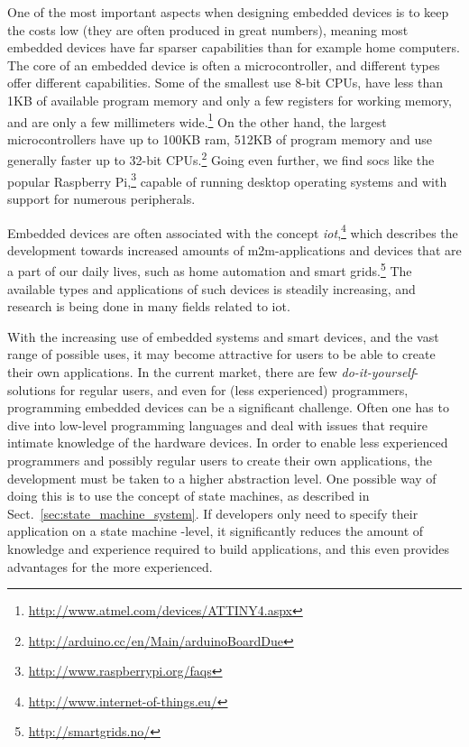 \noindent
One of the most important aspects when designing embedded devices is to keep the costs low (they are often produced in great numbers), meaning most embedded devices have far sparser capabilities than for example home computers. The core of an embedded device is often a microcontroller, and different types offer different capabilities. Some of the smallest use 8-bit CPUs, have less than 1KB of available program memory and only a few registers for working memory, and are only a few millimeters wide.\footnote{\url{http://www.atmel.com/devices/ATTINY4.aspx}} On the other hand, the largest microcontrollers have up to 100KB ram, 512KB of program memory and use generally faster up to 32-bit CPUs.\footnote{\url{http://arduino.cc/en/Main/arduinoBoardDue}} Going even further, we find \glspl{soc} like the popular Raspberry Pi,\footnote{\url{http://www.raspberrypi.org/faqs}} capable of running desktop operating systems and with support for numerous peripherals.

\noindent
Embedded devices are often associated with the concept \emph{\gls{iot}},\footnote{\url{http://www.internet-of-things.eu/}} which describes the development towards increased amounts of \gls{m2m}-applications and devices that are a part of our daily lives, such as home automation and smart grids.\footnote{\url{http://smartgrids.no/}} The available types and applications of such devices is steadily increasing, and research is being done in many fields related to \gls{iot}.

\noindent
With the increasing use of embedded systems and smart devices, and the vast range of possible uses, it may become attractive for users to be able to create their own applications. In the current market, there are few \emph{do-it-yourself}-solutions for regular users, and even for (less experienced) programmers, programming embedded devices can be a significant challenge. Often one has to dive into low-level programming languages and deal with issues that require intimate knowledge of the hardware devices. In order to enable less experienced programmers and possibly regular users to create their own applications, the development must be taken to a higher abstraction level. One possible way of doing this is to use the concept of state machines, as described in Sect.~\ref{sec:state_machine_system}. If developers only need to specify their application on a state machine -level, it significantly reduces the amount of knowledge and experience required to build applications, and this even provides advantages for the more experienced.